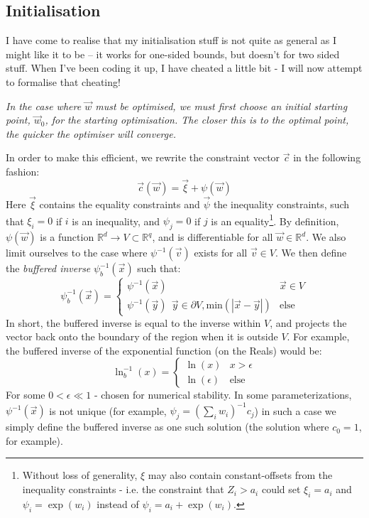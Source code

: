 \documentclass[]{article}
\begin{document}
		\subsection{Initialisation}
			I have come to realise that my initialisation stuff is not quite as general as I might like it to be -- it works for one-sided bounds, but doesn't for two sided stuff. When I've been coding it up, I have cheated a little bit - I will now attempt to formalise that cheating!

			{\it In the case where $\vec{w}$ must be optimised, we must first choose an initial starting point, $\vec{w}_0$, for the starting optimisation. The closer this is to the optimal point, the quicker the optimiser will converge.

			In order to make this efficient, we rewrite the constraint vector $\vec{c}$ in the following fashion:
			\begin{equation}
				\vec{c}(\vec{w}) = \vec{\xi} + \psi(\vec{w})
			\end{equation}
			Here $\vec{\xi}$ contains the equality constraints and $\vec{\psi}$ the inequality constraints, such that $\xi_i = 0$ if $i$ is an inequality, and $\psi_j = 0$ if $j$ is an equality\footnote{Without loss of generality, $\xi$ may also contain constant-offsets from the inequality constraints - i.e. the constraint that $Z_i > a_i$ could set $\xi_i = a_i$ and $\psi_i = \exp(w_i)$ instead of $\psi_i = a_i + \exp(w_i)$.}. By definition, $\psi(\vec{w})$ is a function $\mathbb{R}^d \to V \subset \mathbb{R}^q$, and is differentiable for all $\vec{w} \in \mathbb{R}^d$. We also limit ourselves to the case where $\psi^{-1}(\vec{v})$ exists for all $\vec{v} \in V$. We then define the \textit{buffered inverse} $\psi^{-1}_b(\vec{x})$ such that:
			\begin{equation}
				\psi^{-1}_b(\vec{x}) = \begin{cases} 
					\psi^{-1}(\vec{x}) & \vec{x} \in V
					\\
					\psi^{-1}(\vec{y}) ~~ \vec{y} \in \partial V, \text{min}(|\vec{x} - \vec{y}|) & \text{else}
				\end{cases}
			\end{equation}
			In short, the buffered inverse is equal to the inverse within $V$, and projects the vector back onto the boundary of the region when it is outside $V$. For example, the buffered inverse of the exponential function (on the Reals) would be:
			\begin{equation}
				\ln^{-1}_b(x) = \begin{cases}
					\ln(x) & x > \epsilon
					\\
					\ln(\epsilon) & \text{else{}}
				\end{cases}
			\end{equation}
			For some $0 < \epsilon \ll 1$ - chosen for numerical stability. In some parameterizations, $\psi^{-1}(\vec{x})$ is not unique (for example, $\psi_j = (\sum_i w_i)^{-1} c_j$) in such a case we simply define the buffered inverse as one such solution (the solution where $c_0 = 1$, for example).

}
\end{document}
